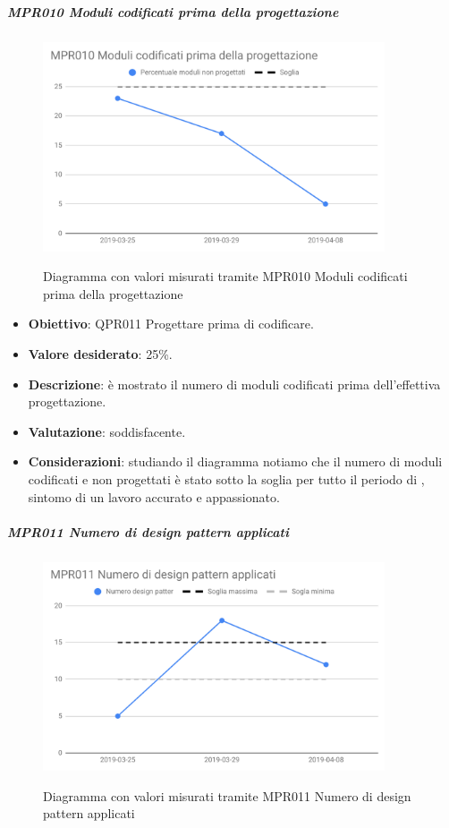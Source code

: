 	\subparagraph{MPR010 Moduli codificati prima della progettazione}
	
	\begin{figure}[H]
		\centering
		\includegraphics[width=0.9\textwidth]{img/cruscotti/RQ/MPR010.png}
		\label{immagineModuliCodificatiRQ}
		\caption{Diagramma con valori misurati tramite MPR010 Moduli codificati prima della progettazione}
	\end{figure}
	
	\begin{itemize}
		\item \textbf{Obiettivo}: QPR011 Progettare prima di codificare.
		\item \textbf{Valore desiderato}: 25\%.
		\item \textbf{Descrizione}: è mostrato il numero di moduli codificati prima dell'effettiva progettazione.
		\item \textbf{Valutazione}: soddisfacente.
		\item \textbf{Considerazioni}: studiando il diagramma notiamo che il numero di moduli codificati e non progettati
		è stato sotto la soglia per tutto il periodo di \RQ, sintomo di un lavoro accurato e appassionato.
	\end{itemize}

	\subparagraph{MPR011 Numero di design pattern applicati}
	
	\begin{figure}[H]
		\centering
		\includegraphics[width=0.9\textwidth]{img/cruscotti/RQ/MPR011.png}
		\label{immagineNumDesignPatternRQ}
		\caption{Diagramma con valori misurati tramite MPR011 Numero di design pattern applicati}
	\end{figure}
	
